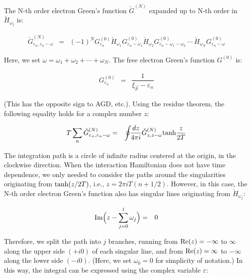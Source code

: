 \documentclass[uplatex,a4j,12pt,dvipdfmx]{jsarticle}
\begin{document}
The N-th order electron Green's function $\check{G}^{(N)}$ expanded up to N-th order in $\check{H}_{\omega_{j}}$ is:

\begin{eqnarray}
	\check{G}^{(N)}_{\varepsilon_{n},\varepsilon_{n} - \omega}
	&=&
	(-1)^{N}
	G^{(0)}_{\varepsilon_{n}}
	\check{H}_{\omega_{1}}
	G^{(0)}_{\varepsilon_{n} - \omega_{1}}
	\check{H}_{\omega_{2}}
	G^{(0)}_{\varepsilon_{n} - \omega_{1} - \omega_{2} }
	\ \cdots \
	\check{H}_{\omega_{N}}
	G^{(0)}_{\varepsilon_{n} - \omega }
\end{eqnarray}

Here, we set $\omega = \omega_{1} + \omega_{2} + \cdots + \omega_{N}$. The free electron Green's function $G^{(0)}$ is:

\begin{eqnarray}
	G^{(0)}_{\varepsilon_{n}}
	&=&
	\dfrac{1}{ \xi_{\vec{p}} - \varepsilon_{n} }
\end{eqnarray}

(This has the opposite sign to AGD, etc.).
Using the residue theorem, the following equality holds for a complex number $z$:

\begin{eqnarray}
	T \sum_{n} \check{G}^{(N)}_{\varepsilon_{n},\varepsilon_{n} - \omega}
	&=&
	\oint \!\! \dfrac{dz}{4 \pi i}
	\check{G}^{(N)}_{z,z - \omega}
	{\rm tanh} \dfrac{z}{2 T}
\end{eqnarray}

The integration path is a circle of infinite radius centered at the origin, in the clockwise direction.
When the interaction Hamiltonian does not have time dependence, we only needed to consider the paths around the singularities originating from ${\rm tanh}(z/2 T)$, i.e., $z=2 \pi i T (n + 1/2)$.
However, in this case, the N-th order electron Green's function also has singular lines originating from $\check{H}_{\omega_{j}}$:

\begin{eqnarray}
	{\rm Im}
	\Big( z - \sum^{l}_{j = 0} \omega_{j} \Big)
	&=&
	0
	\label{eqn:tokuisen}
\end{eqnarray}

Therefore, we split the path into $j$ branches, running from ${\rm Re}(z) = - \infty$ to $\infty$ along the upper side $(+i0)$ of each singular line, and from ${\rm Re}(z) = \infty$ to $-\infty$ along the lower side $(-i0)$.
(Here, we set $\omega_{0}=0$ for simplicity of notation.)
In this way, the integral can be expressed using the complex variable $\varepsilon$:
\end{document}
